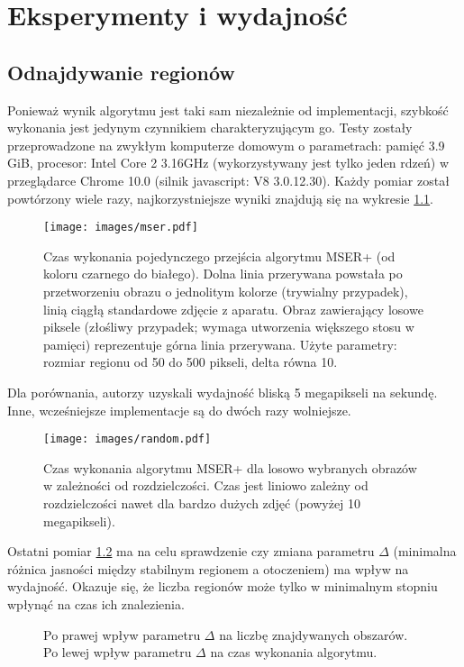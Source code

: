 \chapter{Eksperymenty i wydajność}

\section{Odnajdywanie regionów}

Ponieważ wynik algorytmu jest taki sam niezależnie od implementacji, szybkość
wykonania jest jedynym czynnikiem charakteryzującym go. Testy zostały
przeprowadzone na zwykłym komputerze domowym o parametrach: pamięć 3.9 GiB,
procesor: Intel Core 2 3.16GHz (wykorzystywany jest tylko jeden rdzeń) w
przeglądarce Chrome 10.0 (silnik javascript: V8 3.0.12.30). Każdy pomiar został
powtórzony wiele razy, najkorzystniejsze wyniki znajdują się na wykresie \ref{mser}.

\begin{figure}[h!] \centering \texttt{[image: images/mser.pdf]} \caption{Czas
  wykonania pojedynczego przejścia algorytmu MSER+ (od koloru czarnego do
  białego). Dolna linia przerywana powstała po przetworzeniu obrazu o
  jednolitym kolorze (trywialny przypadek), linią ciągłą standardowe zdjęcie z
  aparatu. Obraz zawierający losowe piksele (złośliwy przypadek; wymaga
  utworzenia większego stosu w pamięci) reprezentuje górna linia przerywana.
  Użyte parametry: rozmiar regionu od 50 do 500 pikseli, delta równa 10.}
  \label{mser} \end{figure}

Dla porównania, autorzy \cite{Nister_Stewenius_2008} uzyskali wydajność bliską
5 megapikseli na sekundę. Inne, wcześniejsze implementacje są do dwóch razy
wolniejsze.

\begin{figure}[h!] \centering \texttt{[image: images/random.pdf]}
\caption{Czas wykonania algorytmu MSER+ dla losowo wybranych obrazów w
zależności od rozdzielczości. Czas jest liniowo zależny od rozdzielczości nawet
dla bardzo dużych zdjęć (powyżej 10 megapikseli).} \end{figure}

Ostatni pomiar \ref{delta} ma na celu sprawdzenie czy zmiana parametru $\Delta$
(minimalna różnica jasności między stabilnym regionem a otoczeniem) ma wpływ na
wydajność. Okazuje się, że liczba regionów może tylko w minimalnym stopniu
wpłynąć na czas ich znalezienia.

\begin{figure} \centering
  \caption{Po prawej wpływ parametru $\Delta$ na liczbę znajdywanych obszarów.
  Po lewej wpływ parametru $\Delta$ na czas wykonania algorytmu.} \label{delta}
\end{figure}

